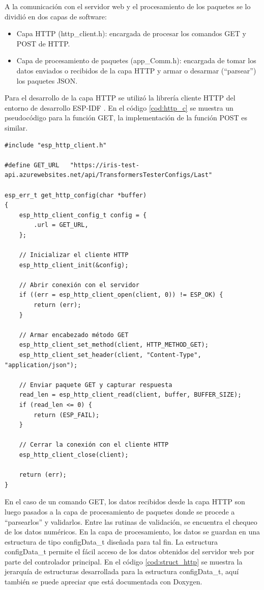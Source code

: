 A la comunicación con el servidor web y el procesamiento de los paquetes se lo dividió en dos capas de software:
\begin{itemize}
\item Capa HTTP (http\_client.h): encargada de procesar los comandos GET y POST de HTTP.
\item Capa de procesamiento de paquetes (app\_Comm.h): encargada de tomar los datos enviados o recibidos de la capa HTTP y armar o desarmar (``parsear'') los paquetes JSON.
\end{itemize}

Para el desarrollo de la capa HTTP se utilizó la librería cliente HTTP del entorno de desarrollo ESP-IDF \citep{HTTPC}. En el código \ref{cod:http_c} se muestra un pseudocódigo para la función GET, la implementación de la función POST es similar.

\begin{lstlisting}[label=cod:http_c,caption=Pseudocódigo función GET de HTTP.]
#include "esp_http_client.h"

#define GET_URL   "https://iris-test-api.azurewebsites.net/api/TransformersTesterConfigs/Last"

esp_err_t get_http_config(char *buffer)
{
    esp_http_client_config_t config = {
    	.url = GET_URL,
    };

    // Inicializar el cliente HTTP
    esp_http_client_init(&config);
    
    // Abrir conexión con el servidor
    if ((err = esp_http_client_open(client, 0)) != ESP_OK) {
        return (err);
    }
    
    // Armar encabezado método GET
    esp_http_client_set_method(client, HTTP_METHOD_GET);
    esp_http_client_set_header(client, "Content-Type", "application/json");
    
    // Enviar paquete GET y capturar respuesta
    read_len = esp_http_client_read(client, buffer, BUFFER_SIZE);
    if (read_len <= 0) {
        return (ESP_FAIL);
    }
    
    // Cerrar la conexión con el cliente HTTP
    esp_http_client_close(client);

    return (err);
}

\end{lstlisting}

En el caso de un comando GET, los datos recibidos desde la capa HTTP son luego pasados a la capa de procesamiento de paquetes donde se procede a ``parsearlos'' y validarlos. Entre las rutinas de validación, se encuentra el chequeo de los datos numéricos. En la capa de procesamiento, los datos se guardan en una estructura de tipo configData\_t diseñada para tal fin. La estructura configData\_t permite el fácil acceso de los datos obtenidos del servidor web por parte del controlador principal. En el código \ref{cod:struct_http} se muestra la jerarquía de estructuras desarrollada para la estructura configData\_t, aquí también se puede apreciar que está documentada con Doxygen.

